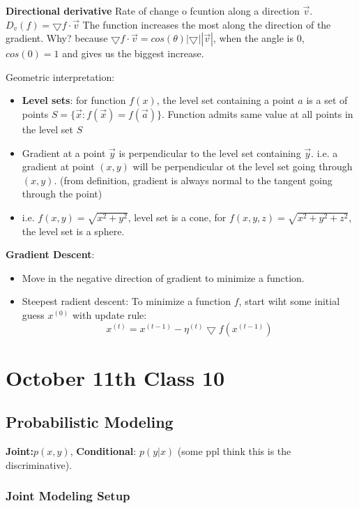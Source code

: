 \textbf{Directional derivative} Rate of change o fcuntion along a
direction $\vec v$. $D_v(f) = \bigtriangledown f\cdot \vec v$
The function increases the most along the direction of the
gradient. Why? because $\bigtriangledown f\cdot \vec v =
cos(\theta)|\bigtriangledown||\vec v|$, when the angle is 0,
$cos(0)=1$ and gives us the biggest increase.


Geometric interpretation:
\begin{itemize}
\item \textbf{Level sets}: for function $f(x)$, the level set
  containing a point $a$ is a set of points $S=\{\vec x: f(\vec x) =
  f(\vec a)\}$. Function admits same value at all points in the level
  set $S$
\item Gradient at a point $\vec y$ is perpendicular to the level set
  containing $\vec y$. i.e. a gradient at point $(x,y)$ will be
  perpendicular ot the level set going through $(x,y)$. (from
  definition, gradient is always normal to the tangent going through
  the point)
\item i.e. $f(x,y) = \sqrt{x^2 + y^2}$, level set is a cone, for
  $f(x,y,z) = \sqrt{x^2 + y^2+z^2}$, the level set is a sphere.
\end{itemize}

\textbf{Gradient Descent}:
\begin{itemize}
\item Move in the negative direction of gradient to minimize a
  function.
\item Steepest radient descent: To minimize a function $f$, start wiht
  some initial guess $x^(0)$ with update rule:
$$x^{(t)} = x^{(t-1)} -\eta^{(t)}\bigtriangledown f(x^{(t-1)})$$
\end{itemize}
\pagebreak

\section{October 11th Class 10}
\label{sec:class10}

\subsection{Probabilistic Modeling}

\textbf{Joint:}$p(x,y)$, \textbf{Conditional}: $p(y|x)$ (some ppl
think this is the discriminative).

\subsubsection{Joint Modeling Setup}
\label{sec:joint}

